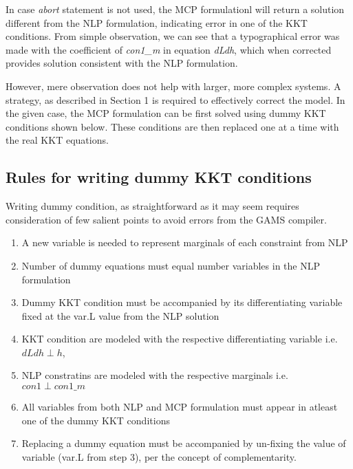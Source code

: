 \documentclass{article}
\begin{document}



\noindent In case \textit{abort} statement is not used, the MCP formulationl will return a solution different from the NLP formulation, indicating
error in one of the KKT conditions. From simple observation, we can see that a typographical error was made with the coefficient of \textit{con1\_m}
in equation \textit{dLdh}, which when corrected provides solution consistent with the NLP formulation.

However, mere observation does not help with larger, more complex  systems. A strategy, as described in Section 1 is required to effectively correct the model.
In the given case, the MCP formulation can be first solved using dummy KKT conditions shown below. These conditions are then replaced
one at a time with the real KKT equations.



\subsection{Rules for writing dummy KKT conditions}

Writing dummy condition, as straightforward as it may seem requires consideration of few salient points to avoid errors from the GAMS compiler.

\begin{enumerate}
	\item A new variable is needed to represent marginals of each constraint from NLP
  \item Number of dummy equations must equal number variables in the NLP formulation
	\item Dummy KKT condition must be accompanied by its differentiating variable fixed at the var.L value from the NLP solution
	\item KKT condition are modeled with the respective differentiating variable i.e. $dLdh \perp h$,
  \item NLP constratins are modeled with the respective marginals i.e. $con1 \perp con1\_m$
	\item All variables from both NLP and MCP formulation must appear in atleast one of the dummy KKT conditions
  \item Replacing a dummy equation must be accompanied by un-fixing the value of variable (var.L from step 3), per the concept of complementarity.

\end{enumerate}
\end{document}
